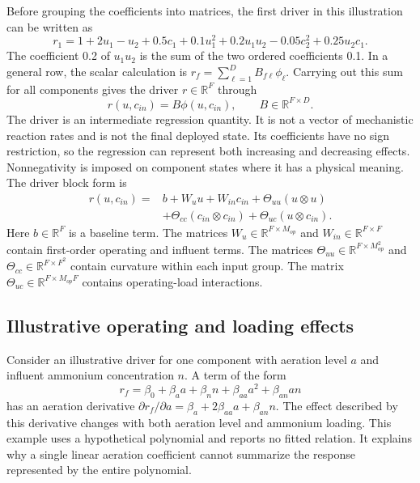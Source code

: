 Before grouping the coefficients into matrices, the first driver in this illustration can be written as
\begin{equation}
\label{eq:icsor_scalar_driver_example}
r_1=1+2u_1-u_2+0.5c_1+0.1u_1^2
+0.2u_1u_2-0.05c_2^2+0.25u_2c_1.
\end{equation}
The coefficient 0.2 of \(u_1u_2\) is the sum of the two ordered coefficients 0.1. In a general row, the scalar calculation is \(r_f=\sum_{\ell=1}^{D}B_{f\ell}\phi_\ell\). Carrying out this sum for all components gives the driver \(r\in\mathbb{R}^{F}\) through
\begin{equation}
\label{eq:icsor_driver}
r(u,c_{in})=B\phi(u,c_{in}),
\qquad B\in\mathbb{R}^{F\times D}.
\end{equation}
The driver is an intermediate regression quantity. It is not a vector of mechanistic reaction rates and is not the final deployed state. Its coefficients have no sign restriction, so the regression can represent both increasing and decreasing effects. Nonnegativity is imposed on component states where it has a physical meaning. The driver block form is
\begin{equation}
\label{eq:icsor_driver_blocks}
\begin{aligned}
r(u,c_{in})={}&b+W_u u+W_{in}c_{in}
+\Theta_{uu}(u\otimes u)\\
&+\Theta_{cc}(c_{in}\otimes c_{in})
+\Theta_{uc}(u\otimes c_{in}).
\end{aligned}
\end{equation}
Here \(b\in\mathbb{R}^{F}\) is a baseline term. The matrices \(W_u\in\mathbb{R}^{F\times M_{op}}\) and \(W_{in}\in\mathbb{R}^{F\times F}\) contain first-order operating and influent terms. The matrices \(\Theta_{uu}\in\mathbb{R}^{F\times M_{op}^{2}}\) and \(\Theta_{cc}\in\mathbb{R}^{F\times F^{2}}\) contain curvature within each input group. The matrix \(\Theta_{uc}\in\mathbb{R}^{F\times M_{op}F}\) contains operating-load interactions.

\subsection{Illustrative operating and loading effects}

Consider an illustrative driver for one component with aeration level \(a\) and influent ammonium concentration \(n\). A term of the form
\begin{equation}
\label{eq:icsor_example_driver}
r_f=\beta_0+\beta_a a+\beta_n n+\beta_{aa}a^2+\beta_{an}an
\end{equation}
has an aeration derivative \(\partial r_f/\partial a=\beta_a+2\beta_{aa}a+\beta_{an}n\). The effect described by this derivative changes with both aeration level and ammonium loading. This example uses a hypothetical polynomial and reports no fitted relation. It explains why a single linear aeration coefficient cannot summarize the response represented by the entire polynomial.

